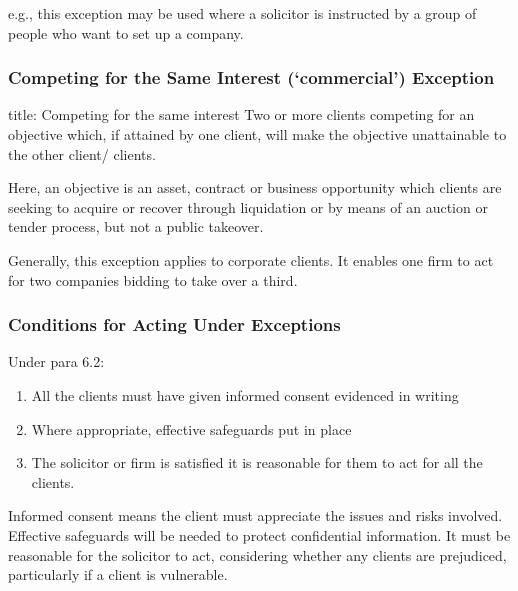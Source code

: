 \documentclass[
]{article}
\newenvironment{Shaded}{}{}
\newcommand{\NormalTok}[1]{#1}
\providecommand{\tightlist}{%
  \setlength{\itemsep}{0pt}\setlength{\parskip}{0pt}}
\begin{document}
e.g., this exception may be used where a solicitor is instructed by a
group of people who want to set up a company.

\hypertarget{competing-for-the-same-interest-commercial-exception}{%
\subsubsection{Competing for the Same Interest (`commercial')
Exception}\label{competing-for-the-same-interest-commercial-exception}}

\begin{Shaded}
\begin{Highlighting}[]
\NormalTok{title: Competing for the same interest}
\NormalTok{Two or more clients competing for an objective which, if attained by one client, will make the objective unattainable to the other client/ clients. }
\end{Highlighting}
\end{Shaded}

Here, an objective is an asset, contract or business opportunity which
clients are seeking to acquire or recover through liquidation or by
means of an auction or tender process, but not a public takeover.

Generally, this exception applies to corporate clients. It enables one
firm to act for two companies bidding to take over a third.

\hypertarget{conditions-for-acting-under-exceptions}{%
\subsubsection{Conditions for Acting Under
Exceptions}\label{conditions-for-acting-under-exceptions}}

Under para 6.2:

\begin{enumerate}
\def\labelenumi{\arabic{enumi}.}
\tightlist
\item
  All the clients must have given informed consent evidenced in writing
\item
  Where appropriate, effective safeguards put in place
\item
  The solicitor or firm is satisfied it is reasonable for them to act
  for all the clients.
\end{enumerate}

Informed consent means the client must appreciate the issues and risks
involved. Effective safeguards will be needed to protect confidential
information. It must be reasonable for the solicitor to act, considering
whether any clients are prejudiced, particularly if a client is
vulnerable.
\end{document}
